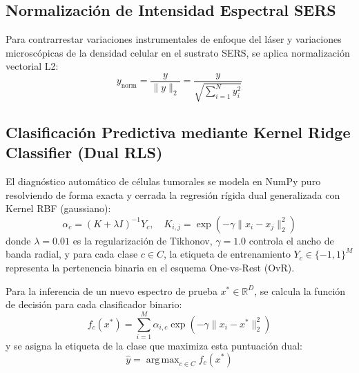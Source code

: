 \subsection{Normalización de Intensidad Espectral SERS}
Para contrarrestar variaciones instrumentales de enfoque del láser y variaciones microscópicas de la densidad celular en el sustrato SERS, se aplica normalización vectorial L2:
\begin{equation}
    y_{\text{norm}} = \frac{y}{\|y\|_2} = \frac{y}{\sqrt{\sum_{i=1}^N y_i^2}}
\end{equation}

\subsection{Clasificación Predictiva mediante Kernel Ridge Classifier (Dual RLS)}
El diagnóstico automático de células tumorales se modela en NumPy puro resolviendo de forma exacta y cerrada la regresión rígida dual generalizada con Kernel RBF (gaussiano):
\begin{equation}
    \alpha_c = (K + \lambda I)^{-1} Y_c, \quad K_{i,j} = \exp\left(-\gamma \|x_i - x_j\|_2^2\right)
\end{equation}
donde $\lambda=0.01$ es la regularización de Tikhonov, $\gamma=1.0$ controla el ancho de banda radial, y para cada clase $c \in C$, la etiqueta de entrenamiento $Y_c \in \{-1, 1\}^M$ representa la pertenencia binaria en el esquema One-vs-Rest (OvR).

Para la inferencia de un nuevo espectro de prueba $x^* \in \mathbb{R}^D$, se calcula la función de decisión para cada clasificador binario:
\begin{equation}
    f_c(x^*) = \sum_{i=1}^{M} \alpha_{i,c} \exp\left(-\gamma \|x_i - x^*\|_2^2\right)
\end{equation}
y se asigna la etiqueta de la clase que maximiza esta puntuación dual:
\begin{equation}
    \hat{y} = \operatorname{arg\,max}_{c \in C} f_c(x^*)
\end{equation}

